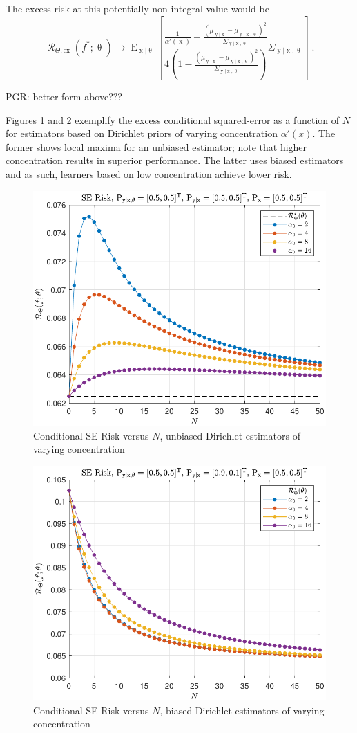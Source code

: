 \documentclass[12pt]{report}
\DeclareMathOperator{\xrm}{\mathrm{x}}
\DeclareMathOperator{\yrm}{\mathrm{y}}
\DeclareMathOperator{\Erm}{\mathrm{E}}
\DeclareMathOperator{\Rcal}{\mathcal{R}}
\begin{document}
The excess risk at this potentially non-integral value would be 
\begin{equation}
\Rcal_{\Theta, \mathrm{ex}}(f^* ; \uptheta) \to \Erm_{\xrm | \uptheta}\left[ \frac{\frac{1}{\alpha'(\xrm)} - \frac{\left( \mu_{\yrm | \xrm} - \mu_{\yrm | \xrm,\uptheta} \right)^2}{\Sigma_{\yrm | \xrm,\uptheta}}}{4\left( 1 - \frac{\left( \mu_{\yrm | \xrm} - \mu_{\yrm | \xrm,\uptheta} \right)^2}{\Sigma_{\yrm | \xrm,\uptheta}} \right)} \Sigma_{\yrm | \xrm,\uptheta} \right] \;.
\end{equation}

PGR: better form above???

Figures \ref{fig:Risk_cond_SE_Dir_N_leg_a0_unbiased} and \ref{fig:Risk_cond_SE_Dir_N_leg_a0_biased} exemplify the excess conditional squared-error as a function of $N$ for estimators based on Dirichlet priors of varying concentration $\alpha'(x)$. The former shows local maxima for an unbiased estimator; note that higher concentration results in superior performance. The latter uses biased estimators and as such, learners based on low concentration achieve lower risk.
\begin{figure}
\centering
\includegraphics[width=0.7\linewidth]{Risk_cond_SE_Dir_N_leg_a0_unbiased.pdf}
\caption{Conditional SE Risk versus $N$, unbiased Dirichlet estimators of varying concentration}
\label{fig:Risk_cond_SE_Dir_N_leg_a0_unbiased}
\end{figure}
\begin{figure}
\centering
\includegraphics[width=0.7\linewidth]{Risk_cond_SE_Dir_N_leg_a0_biased.pdf}
\caption{Conditional SE Risk versus $N$, biased Dirichlet estimators of varying concentration}
\label{fig:Risk_cond_SE_Dir_N_leg_a0_biased}
\end{figure}
\end{document}
